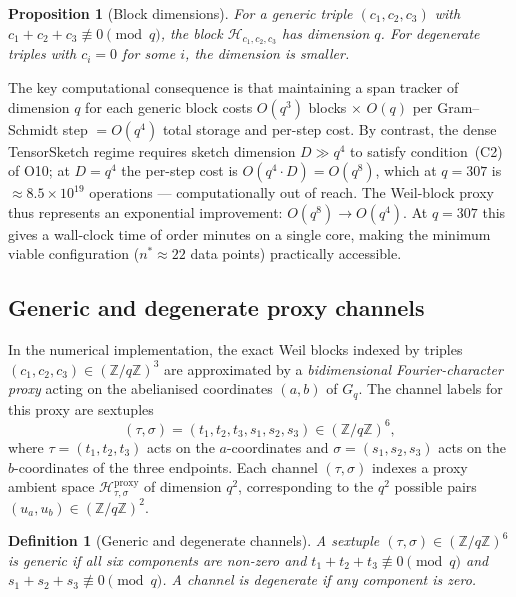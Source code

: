 \documentclass[11pt,a4paper]{article}
\newtheorem{proposition}[theorem]{Proposition}
\newtheorem{definition}[theorem]{Definition}
\begin{document}
    \begin{proposition}[Block dimensions]
      \label{prop:block-dims}
      For a generic triple $(c_1, c_2, c_3)$ with $c_1 + c_2 + c_3 \not\equiv 0 \pmod{q}$, the
      block $\mathcal{H}_{c_1, c_2, c_3}$ has dimension $q$.
      For degenerate triples with $c_i = 0$ for some $i$, the dimension is smaller.
    \end{proposition}

    The key computational consequence is that maintaining a span tracker of dimension $q$ for each
    generic block costs $O(q^3)$ blocks $\times$ $O(q)$ per Gram--Schmidt step $= O(q^4)$ total
    storage and per-step cost.
    By contrast, the dense TensorSketch regime requires sketch dimension $D \gg q^4$ to satisfy
    condition~(C2) of O10; at $D = q^4$ the per-step cost is $O(q^4 \cdot D) = O(q^8)$, which
    at $q = 307$ is $\approx 8.5 \times 10^{19}$ operations --- computationally out of reach.
    The Weil-block proxy thus represents an exponential improvement: $O(q^8) \to O(q^4)$.
    At $q = 307$ this gives a wall-clock time of order minutes on a single core, making the
    minimum viable configuration ($n^* \approx 22$ data points) practically accessible.

  \subsection{Generic and degenerate proxy channels}
    \label{sec:generic-degenerate}

    In the numerical implementation, the exact Weil blocks indexed by triples
    $(c_1, c_2, c_3) \in (\mathbb{Z}/q\mathbb{Z})^3$ are approximated by a
    \emph{bidimensional Fourier-character proxy} acting on the abelianised coordinates
    $(a, b)$ of $G_q$.
    The channel labels for this proxy are sextuples
    \begin{equation}
      \label{eq:channel-index}
      (\tau, \sigma) = (t_1, t_2, t_3, s_1, s_2, s_3) \in (\mathbb{Z}/q\mathbb{Z})^6,
    \end{equation}
    where $\tau = (t_1, t_2, t_3)$ acts on the $a$-coordinates and
    $\sigma = (s_1, s_2, s_3)$ acts on the $b$-coordinates of the three endpoints.
    Each channel $(\tau,\sigma)$ indexes a proxy ambient space
    $\mathcal{H}^{\mathrm{proxy}}_{\tau,\sigma}$ of dimension $q^2$, corresponding to
    the $q^2$ possible pairs $(u_a, u_b) \in (\mathbb{Z}/q\mathbb{Z})^2$.

    \begin{definition}[Generic and degenerate channels]
      \label{def:generic}
      A sextuple $(\tau, \sigma) \in (\mathbb{Z}/q\mathbb{Z})^6$ is \emph{generic} if all six
      components are non-zero and $t_1 + t_2 + t_3 \not\equiv 0 \pmod{q}$ and
      $s_1 + s_2 + s_3 \not\equiv 0 \pmod{q}$.
      A channel is \emph{degenerate} if any component is zero.
    \end{definition}
\end{document}
